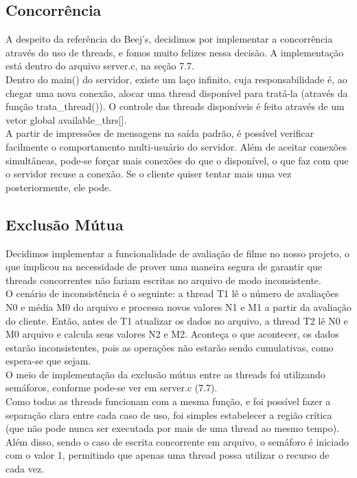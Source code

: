 \documentclass[11pt,twoside]{article}
\begin{document}
\subsection{Concorrência}
A despeito da referência do Beej's, decidimos por implementar a concorrência através do uso de threads, e fomos muito felizes nessa decisão. A implementação está dentro do arquivo server.c, na seção 7.7.\\
Dentro do main() do servidor, existe um laço infinito, cuja responsabilidade é, ao chegar uma nova conexão, alocar uma thread disponível para tratá-la (através da função trata\_thread()). O controle das threads disponíveis é feito através de um vetor global available\_thrs[].\\
A partir de impressões de mensagens na saída padrão, é possível verificar facilmente o comportamento multi-usuário do servidor. Além de aceitar conexões simultâneas, pode-se forçar mais conexões do que o disponível, o que faz com que o servidor recuse a conexão. Se o cliente quiser tentar mais uma vez posteriormente, ele pode.

\subsection{Exclusão Mútua}
Decidimos implementar a funcionalidade de avaliação de filme no nosso projeto, o que implicou na necessidade de prover uma maneira segura de garantir que threads concorrentes não fariam escritas no arquivo de modo inconsistente.\\
O cenário de inconsistência é o seguinte: a thread T1 lê o número de avaliações N0 e média M0 do arquivo e processa novos valores N1 e M1 a partir da avaliação do cliente. Então, antes de T1 atualizar os dados no arquivo, a thread T2 lê N0 e M0 arquivo e calcula seus valores N2 e M2. Aconteça o que acontecer, os dados estarão inconsistentes, pois as operações não estarão sendo cumulativas, como espera-se que sejam.\\
O meio de implementação da exclusão mútua entre as threads foi utilizando semáforos, conforme pode-se ver em server.c (7.7).\\
Como todas as threads funcionam com a mesma função, e foi possível fazer a separação clara entre cada caso de uso, foi simples estabelecer a região crítica (que não pode nunca ser executada por mais de uma thread ao mesmo tempo).\\
Além disso, sendo o caso de escrita concorrente em arquivo, o semáforo é iniciado com o valor 1, permitindo que apenas uma thread possa utilizar o recurso de cada vez.
\end{document}
